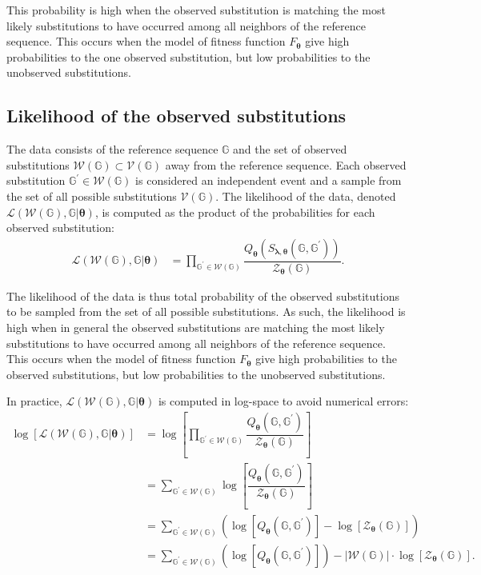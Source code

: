 \documentclass{article}
\newcommand{\Multiply}{\cdot}
\newcommand{\Geno}{\mathbb{G}}
\newcommand{\GenoDer}{\Geno^{\prime}}
\newcommand{\setNeighbors}{\mathcal{V}\left(\Geno\right)}
\newcommand{\Observed}{\mathcal{W}\left(\Geno\right)}
\newcommand{\PhenoParam}{\bm{\lambda}}
\newcommand{\FitParam}{\bm{\theta}}
\newcommand{\PhenoFitMapDef}{F}
\newcommand{\PhenoFitMap}{\PhenoFitMapDef_{\FitParam}}
\newcommand{\SelCoeff}{S_{\PhenoParam, \FitParam}}
\newcommand{\PsubDef}{Q}
\newcommand{\Psub}{\PsubDef_{\FitParam}}
\newcommand{\Normalize}{\mathcal{Z}_{\FitParam}\left(\Geno\right)}
\begin{document}
    This probability is high when the observed substitution is matching the most likely substitutions to have occurred among all neighbors of the reference sequence.
    This occurs when the model of fitness function $\PhenoFitMap$ give high probabilities to the one observed substitution, but low probabilities to the unobserved substitutions.

    \subsection{Likelihood of the observed substitutions}\label{subsec:likelihood-of-the-data}
    The data consists of the reference sequence $\Geno$ and the set of observed substitutions $\Observed \subset \setNeighbors$ away from the reference sequence.
    Each observed substitution $\GenoDer \in \Observed$ is considered an independent event and a sample from the set of all possible substitutions $\setNeighbors$.
    The likelihood of the data, denoted $\mathcal{L} (\Observed, \Geno | \FitParam )$, is computed as the product of the probabilities for each observed substitution:
    \begin{align}
        \mathcal{L} (\Observed, \Geno | \FitParam ) & = \prod_{\GenoDer \in \Observed} \dfrac{\Psub \left( \SelCoeff \left( \Geno,\GenoDer\right)\right)}{\Normalize}.
    \end{align}

    The likelihood of the data is thus total probability of the observed substitutions to be sampled from the set of all possible substitutions.
    As such, the likelihood is high when in general the observed substitutions are matching the most likely substitutions to have occurred among all neighbors of the reference sequence.
    This occurs when the model of fitness function $\PhenoFitMap$ give high probabilities to the observed substitutions, but low probabilities to the unobserved substitutions.

    In practice, $\mathcal{L} (\Observed, \Geno | \FitParam )$ is computed in log-space to avoid numerical errors:
    \begin{align}
        \log \left[ \mathcal{L} (\Observed, \Geno | \FitParam ) \right] & = \log \left[  \prod_{\GenoDer \in \Observed} \dfrac{\Psub \left( \Geno,\GenoDer\right)}{\Normalize} \right] \\
        & = \sum_{\GenoDer \in \Observed} \log \left[ \dfrac{ \Psub \left( \Geno,\GenoDer \right)}{\Normalize} \right] \\
        & = \sum_{\GenoDer \in \Observed} \left(  \log \left[ \Psub \left( \Geno,\GenoDer \right)\right] - \log \left[ \Normalize \right] \right) \\
        & = \sum_{\GenoDer \in \Observed} \left(  \log \left[ \Psub \left( \Geno,\GenoDer \right)\right] \right) - | \Observed | \Multiply \log \left[ \Normalize \right].
    \end{align}
\end{document}
